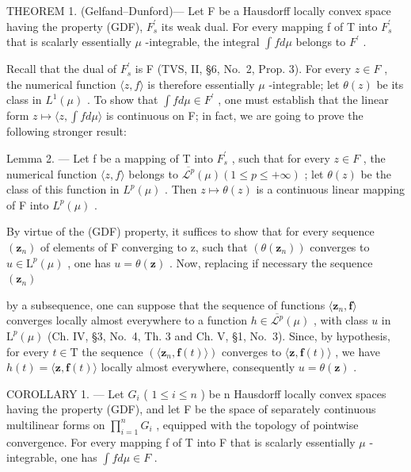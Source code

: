 THEOREM 1. (Gelfand--Dunford)--- Let F be a Hausdorff locally convex space having the property (GDF), \(F_{s}^{\prime}\) its weak dual. For every mapping f of T into \(F_{s}^{\prime}\) that is scalarly essentially \(\mu\) -integrable, the integral \(\int f d\mu\) belongs to \(F^{\prime}\) .

Recall that the dual of \(F_{s}^{\prime}\) is F (TVS, II, §6, No.~2, Prop. 3). For every \(z \in F\) , the numerical function \(\langle z, f \rangle\) is therefore essentially \(\mu\) -integrable; let \(\theta(z)\) be its class in \(L^{1}(\mu)\) . To show that \(\int f d\mu \in F^{\prime}\) , one must establish that the linear form \(z \mapsto \langle z, \int f d\mu \rangle\) is continuous on F; in fact, we are going to prove the following stronger result:

Lemma 2. --- Let f be a mapping of T into \(F_{s}^{\prime}\) , such that for every \(z \in F\) , the numerical function \(\langle z, f \rangle\) belongs to \(\overline{\mathcal{L}^{p}}(\mu) (1 \leqslant p \leqslant +\infty)\) ; let \(\theta(z)\) be the class of this function in \(L^{p}(\mu)\) . Then \(z \mapsto \theta(z)\) is a continuous linear mapping of F into \(L^{p}(\mu)\) .

By virtue of the (GDF) property, it suffices to show that for every sequence \((\mathbf{z}_{n})\) of elements of F converging to z, such that \((\theta(\mathbf{z}_{n}))\) converges to \(u \in \mathrm{L}^{p}(\mu)\) , one has \(u = \theta(\mathbf{z})\) . Now, replacing if necessary the sequence \((\mathbf{z}_{n})\)

by a subsequence, one can suppose that the sequence of functions \(\langle \mathbf{z}_n,\mathbf{f}\rangle\) converges locally almost everywhere to a function \(h\in \overline{\mathcal{L}^p} (\mu)\) , with class \(u\) in \(\mathrm{L}^p (\mu)\) (Ch. IV, §3, No.~4, Th. 3 and Ch. V, §1, No.~3). Since, by hypothesis, for every \(t\in \mathrm{T}\) the sequence \((\langle \mathbf{z}_n,\mathbf{f}(t)\rangle)\) converges to \(\langle \mathbf{z},\mathbf{f}(t)\rangle\) , we have \(h(t) = \langle \mathbf{z},\mathbf{f}(t)\rangle\) locally almost everywhere, consequently \(u = \theta (\mathbf{z})\) .

COROLLARY 1. --- Let \(G_{i}\) ( \(1 \leqslant i \leqslant n\) ) be n Hausdorff locally convex spaces having the property (GDF), and let F be the space of separately continuous multilinear forms on \(\prod_{i=1}^{n} G_{i}\) , equipped with the topology of pointwise convergence. For every mapping f of T into F that is scalarly essentially \(\mu\) -integrable, one has \(\int f d\mu \in F\) .

